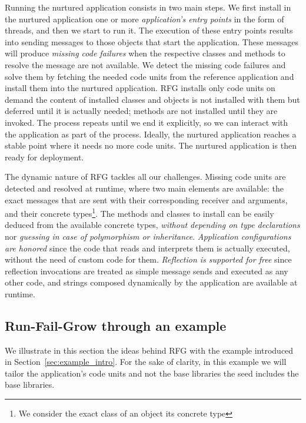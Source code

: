 Running the nurtured application consists in two main steps. We first install in the nurtured application one or more \emph{application's entry points} in the form of threads, and then we start to run it.
The execution of these entry points results into sending messages to those objects that start the application. These messages will produce \emph{missing code failures} when the respective classes and methods to resolve the message are not available.
We detect the missing code failures and solve them by fetching the needed code units from the reference application and install them into the nurtured application. RFG installs only code units on demand \ie the content of installed classes and objects is not installed with them but deferred until it is actually needed; methods are not installed until they are invoked.
The process repeats until we end it explicitly, so we can interact with the application as part of the process. Ideally, the nurtured application reaches a stable point where it needs no more code units.
The nurtured application is then ready for deployment.

The dynamic nature of RFG tackles all our challenges. Missing code units are detected and resolved at runtime, where two main elements are available: the exact messages that are sent with their corresponding receiver and arguments, and their concrete types\footnote{We consider the exact class of an object its concrete type}. The methods and classes to install can be easily deduced from the available concrete types, \emph{without depending on type declarations} nor \emph{guessing in case of polymorphism or inheritance}. \emph{Application configurations are honored} since the code that reads and interprets them is actually executed, without the need of custom code for them. \emph{Reflection is supported for free} since reflection invocations are treated as simple message sends and executed as any other code, and strings composed dynamically by the application are available at runtime. 




\subsection{Run-Fail-Grow through an example}
We illustrate in this section the ideas behind RFG with the example introduced in Section~\ref{sec:example_intro}. For the sake of clarity, in this example we will tailor the application's code units and not the base libraries \ie the seed includes the base libraries.


